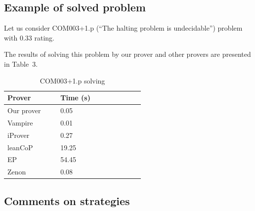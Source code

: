 \documentclass[runningheads,a4paper]{llncs}
\begin{document}
\subsection{Example of solved problem}
Let us consider COM003+1.p (``The halting problem is undecidable'') problem with 0.33 rating.

The results of solving this problem by our prover and other provers are presented in Table~3.

\begin{table}
\caption{COM003+1.p solving}
\begin{tabular}{|p{0.2\linewidth}|p{0.35\linewidth}|}

\hline
\textbf{Prover} & \textbf{Time (s)} \\
\hline
Our prover & 0.05 \\
\hline
Vampire & 0.01 \\
\hline
iProver & 0.27 \\
\hline
leanCoP & 19.25 \\
\hline
EP & 54.45  \\
\hline
Zenon & 0.08 \\
\hline
\end{tabular}
\end{table}










\subsection{Comments on strategies}

\end{document}
